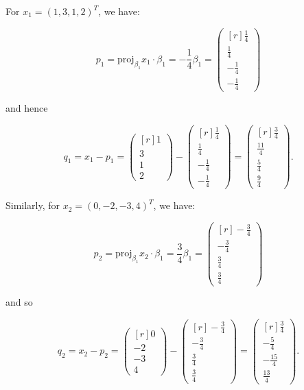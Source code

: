 \begin{solution}
  For $x_1 = (1, 3, 1, 2)^T$, we have:

  $$
  p_1 = \text{proj}_{\beta_1} x_1 \cdot \beta_1 = -\frac{1}{4} \beta_1 = \begin{pmatrix*}[r]
    \frac{1}{4} \\[6pt]
    \frac{1}{4} \\[6pt]
   -\frac{1}{4} \\[6pt]
   -\frac{1}{4}
  \end{pmatrix*}
  $$

  and hence

  $$
  q_1 = x_1 - p_1 
      = \begin{pmatrix*}[r]
        1 \\[6pt]
        3 \\[6pt]
        1 \\[6pt]
        2
      \end{pmatrix*}
      - \begin{pmatrix*}[r]
        \frac{1}{4} \\[6pt]
        \frac{1}{4} \\[6pt]
       -\frac{1}{4} \\[6pt]
       -\frac{1}{4}
      \end{pmatrix*}
      = \begin{pmatrix*}[r]
        \frac{3}{4} \\[6pt]
        \frac{11}{4} \\[6pt]
        \frac{5}{4} \\[6pt]
        \frac{9}{4}
      \end{pmatrix*}.
  $$

  Similarly, for $x_2 = (0, -2, -3, 4)^T$, we have:

  $$
  p_2 = \text{proj}_{\beta_1} x_2 \cdot \beta_1 = \frac{3}{4} \beta_1 = \begin{pmatrix*}[r]
   -\frac{3}{4} \\[6pt]
   -\frac{3}{4} \\[6pt]
    \frac{3}{4} \\[6pt]
    \frac{3}{4}
  \end{pmatrix*}
  $$

  and so

  $$
  q_2 = x_2 - p_2 
      = \begin{pmatrix*}[r]
        0 \\[6pt]
       -2 \\[6pt]
       -3 \\[6pt]
        4
      \end{pmatrix*}
      - \begin{pmatrix*}[r]
       -\frac{3}{4} \\[6pt]
       -\frac{3}{4} \\[6pt]
        \frac{3}{4} \\[6pt]
        \frac{3}{4}
      \end{pmatrix*}
      = \begin{pmatrix*}[r]
        \frac{3}{4} \\[6pt]
       -\frac{5}{4} \\[6pt]
       -\frac{15}{4} \\[6pt]
        \frac{13}{4}
      \end{pmatrix*}.
  $$

  \ \\
\end{solution}